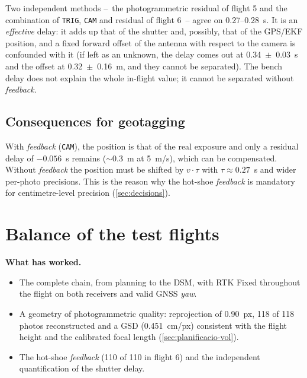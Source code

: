 Two independent methods --~the photogrammetric residual of flight 5 and the combination of \texttt{TRIG}, \texttt{CAM} and residual of flight 6~-- agree on 0.27--0.28~s. It is an \emph{effective} delay: it adds up that of the shutter and, possibly, that of the GPS/EKF position, and a fixed forward offset of the antenna with respect to the camera is confounded with it (if left as an unknown, the delay comes out at 0.34~$\pm$~0.03~s and the offset at 0.32~$\pm$~0.16~m, and they cannot be separated). The bench delay does not explain the whole in-flight value; it cannot be separated without \emph{feedback}.

\subsection{Consequences for geotagging}

With \emph{feedback} (\texttt{CAM}), the position is that of the real exposure and only a residual delay of $-0.056$~s remains ($\sim$0.3~m at 5~m/s), which can be compensated. Without \emph{feedback} the position must be shifted by $v\cdot\tau$ with $\tau \approx 0.27$~s and wider per-photo precisions. This is the reason why the hot-shoe \emph{feedback} is mandatory for centimetre-level precision (\cref{sec:decisions}).

\section{Balance of the test flights}
\label{sec:balanc-vols}

\textbf{What has worked.}
\begin{itemize}
    \item The complete chain, from planning to the DSM, with RTK Fixed throughout the flight on both receivers and valid GNSS \emph{yaw}.
    \item A geometry of photogrammetric quality: reprojection of 0.90~px, 118 of 118 photos reconstructed and a GSD (0.451~cm/px) consistent with the flight height and the calibrated focal length (\cref{sec:planificacio-vol}).
    \item The hot-shoe \emph{feedback} (110 of 110 in flight 6) and the independent quantification of the shutter delay.
\end{itemize}

